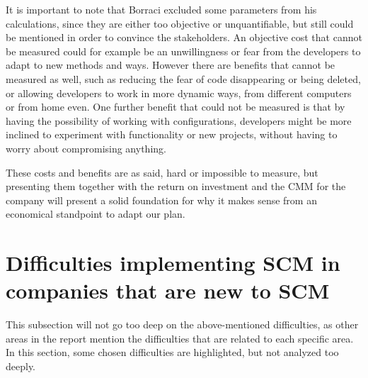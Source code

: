 \documentclass[10pt]{article}
\begin{document}
\noindent It is important to note that Borraci excluded some parameters from his calculations, since they are either too objective or unquantifiable, but still could be mentioned in order to convince the stakeholders. An objective cost that cannot be measured could for example be an unwillingness or fear from the developers to adapt to new methods and ways. However there are benefits that cannot be measured as well, such as reducing the fear of code disappearing or being deleted, or allowing developers to work in more dynamic ways, from different computers or from home even. One further benefit that could not be measured is that by having the possibility of working with configurations, developers might be more inclined to experiment with functionality or new projects, without having to worry about compromising anything. 

\noindent These costs and benefits are as said, hard or impossible to measure, but presenting them together with the return on investment and the CMM for the company will present a solid foundation for why it makes sense from an economical standpoint to adapt our plan.

\section{Difficulties implementing SCM in companies that are new to SCM}
This subsection will not go too deep on the above-mentioned difficulties, as other areas in the report mention the difficulties that are related to each specific area. In this section, some chosen difficulties are highlighted, but not analyzed too deeply.
\end{document}
